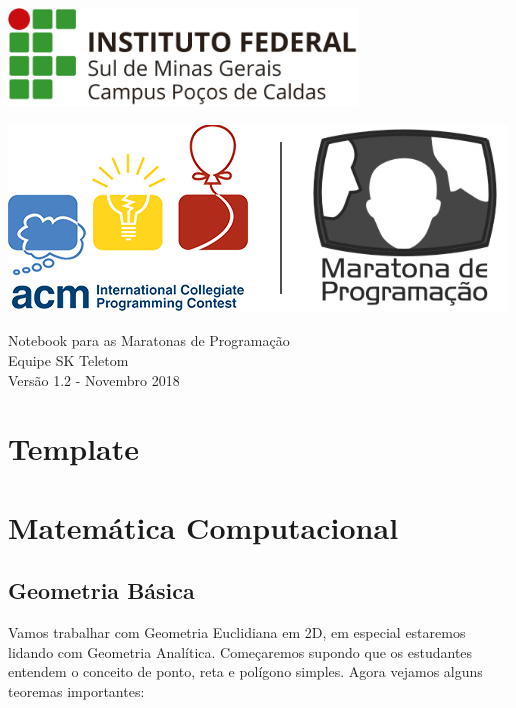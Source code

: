 \documentclass[a4paper,12pt]{article}
\begin{document}
\begin{center}
\begin{center}
  \includegraphics[width=350]{figures/logo_if_horizontal.jpg}
\end{center}
\vspace{7cm}
\begin{center}
  \includegraphics[width=\linewidth/2]{figures/logo_icpc_mdp.png}
\end{center}
\Large{Notebook para as Maratonas de Programação}\\
\large{Equipe SK Teletom}\\
\vspace{9cm}
\large{Versão 1.2 - Novembro 2018}
\end{center}

\newpage
\tableofcontents
\thispagestyle{empty}

\newpage
\section{Template}

\newpage

\section{Matemática Computacional}

\subsection{Geometria Básica}
Vamos trabalhar com Geometria Euclidiana em 2D, em especial estaremos lidando com Geometria Analítica. Começaremos supondo que os estudantes entendem o conceito de ponto, reta e polígono simples. Agora vejamos alguns teoremas importantes:
\end{document}
